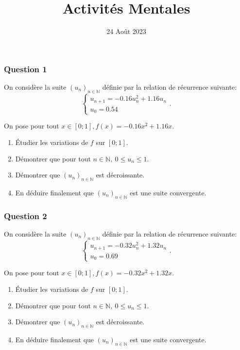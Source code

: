 \documentclass[15pt, mathserif]{beamer}
\title{Activités Mentales}
\date{24 Août 2023}
\begin{document}
\begin{frame}
    \titlepage
\end{frame}

\begin{frame} 
	\frametitle{Question 1}
On considère la suite $(u_n)_{n\in\mathbb{N}}$ définie par la relation de récurrence suivante:\[\begin{cases} u_{n+1} = -0.16u_n^2+1.16u_n\\[1em] u_0 = 0.54\end{cases}.\]

On pose pour tout $x \in [0;1], f(x) = -0.16x^2+1.16x$.

\begin{enumerate}
	\item Étudier les variations de $f$ sur $[0;1]$.
	\item Démontrer que pour tout $n \in \mathbb{N}, ~0 \leq u_n \leq 1$.
	\item Démontrer que $(u_n)_{n\in\mathbb{N}}$ est décroissante.
	\item En déduire finalement que $(u_n)_{n\in\mathbb{N}}$ est une suite convergente.
\end{enumerate}
\end{frame}


\begin{frame} 
	\frametitle{Question 2}
On considère la suite $(u_n)_{n\in\mathbb{N}}$ définie par la relation de récurrence suivante:\[\begin{cases} u_{n+1} = -0.32u_n^2+1.32u_n\\[1em] u_0 = 0.69\end{cases}.\]

On pose pour tout $x \in [0;1], f(x) = -0.32x^2+1.32x$.

\begin{enumerate}
	\item Étudier les variations de $f$ sur $[0;1]$.
	\item Démontrer que pour tout $n \in \mathbb{N}, ~0 \leq u_n \leq 1$.
	\item Démontrer que $(u_n)_{n\in\mathbb{N}}$ est décroissante.
	\item En déduire finalement que $(u_n)_{n\in\mathbb{N}}$ est une suite convergente.
\end{enumerate}
\end{frame}
\end{document}
